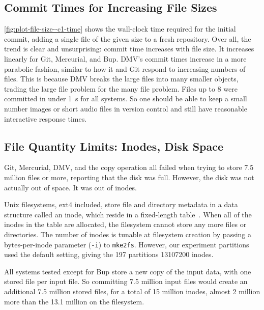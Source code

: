 %

\subsection{Commit Times for Increasing File Sizes}

\autoref{fig:plot-file-size--c1-time} shows the wall-clock time required for the initial \gls{commit}, adding a single file of the given size to a fresh \gls{repository}.
Over all, the trend is clear and unsurprising: \gls{commit} time increases with file size.
It increases linearly for Git, Mercurial, and Bup.
DMV's commit times increase in a more parabolic fashion, similar to how it and Git respond to increasing numbers of files.
This is because DMV breaks the large files into many smaller objects, trading the large file problem for the many file problem.
Files up to \SI{8}{\mib} were committed in under \SI{1}{\second} for all systems.
So one should be able to keep a small number images or short audio files in version control and still have reasonable interactive response times.

%



\subsection{File Quantity Limits: Inodes, Disk Space}

Git, Mercurial, DMV, and the copy operation all failed when trying to store \num{7.5} million files or more, reporting that the disk was full.
However, the disk was not actually out of space.
It was out of \glspl{inode}.

Unix filesystems, ext4 included, store file and directory metadata in a data structure called an \gls{inode}, which reside in a fixed-length table~\cite{unix_timesharing_system}.
When all of the \glspl{inode} in the table are allocated, the filesystem cannot store any more files or directories.
The number of inodes is tunable at filesystem creation by passing a bytes-per-inode parameter (\lstinline{-i}) to \lstinline{mke2fs}.
However, our experiment partitions used the default setting, giving the \SI{197}{\gib} partitions \num{13107200} inodes.

All systems tested except for Bup store a new copy of the input data, with one stored file per input file.
So committing \num{7.5} million input files would create an additional \num{7.5} million stored files, for a total of \num{15} million inodes, almost \num{2} million more than the \num{13.1} million on the filesystem.

